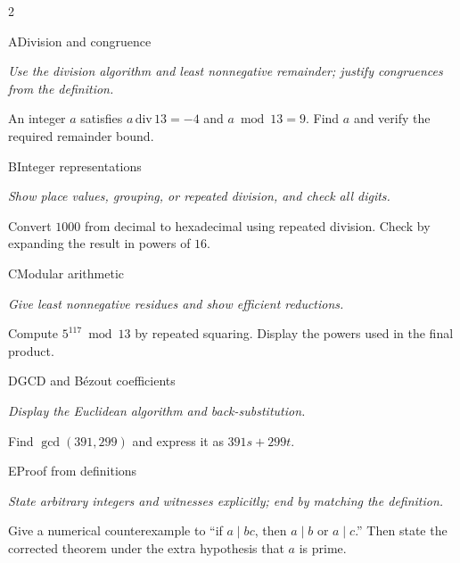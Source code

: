 \documentclass[9pt]{extarticle}
\begin{document}
\begin{multicols}{2}
\begin{CoreProblem}{A}{Division and congruence}
{\scriptsize\textit{Use the division algorithm and least nonnegative remainder; justify congruences from the definition.}\par}
An integer $a$ satisfies $a\,\mathrm{div}\,13=-4$ and $a\bmod13=9$.
Find $a$ and verify the required remainder bound.
\end{CoreProblem}
\begin{CoreProblem}{B}{Integer representations}
{\scriptsize\textit{Show place values, grouping, or repeated division, and check all digits.}\par}
Convert $1000$ from decimal to hexadecimal using repeated division. Check by
expanding the result in powers of $16$.
\end{CoreProblem}
\begin{CoreProblem}{C}{Modular arithmetic}
{\scriptsize\textit{Give least nonnegative residues and show efficient reductions.}\par}
Compute $5^{117}\bmod13$ by repeated squaring. Display the powers used in the
final product.
\end{CoreProblem}
\columnbreak
\begin{CoreProblem}{D}{GCD and B\'ezout coefficients}
{\scriptsize\textit{Display the Euclidean algorithm and back-substitution.}\par}
Find $\gcd(391,299)$ and express it as $391s+299t$.
\end{CoreProblem}
\begin{CoreProblem}{E}{Proof from definitions}
{\scriptsize\textit{State arbitrary integers and witnesses explicitly; end by matching the definition.}\par}
Give a numerical counterexample to ``if $a\mid bc$, then $a\mid b$ or
$a\mid c$.'' Then state the corrected theorem under the extra hypothesis that
$a$ is prime.
\end{CoreProblem}
\end{multicols}
\CoreWorkArea
\FormBreak
{}
\end{document}
